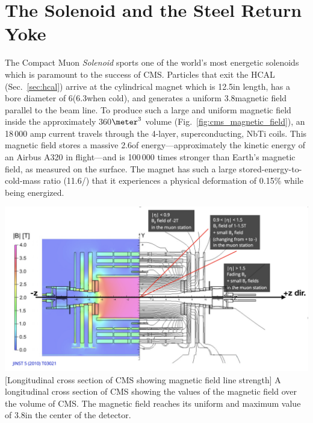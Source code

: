 \section{The Solenoid and the Steel Return Yoke}
\label{sec:solenoid}

The Compact Muon \emph{Solenoid} sports one of the world's most energetic solenoids which is paramount to the success of CMS.
Particles that exit the HCAL (Sec.~\ref{sec:hcal}) arrive at the cylindrical magnet which is 12.5\meter in length, has a bore diameter of 6\meter (6.3\meter when cold), and generates a uniform 3.8\tesla magnetic field parallel to the beam line.
To produce such a large and uniform magnetic field inside the approximately 360$\meter^3$ volume (Fig.~\ref{fig:cms_magnetic_field}), an 18\,000 amp current travels through the 4-layer, superconducting, NbTi coils.
This magnetic field stores a massive 2.6\GJ of energy---approximately the kinetic energy of an Airbus A320 in flight---and is 100\,000 times stronger than Earth's magnetic field, as measured on the surface.
The magnet has such a large stored-energy-to-cold-mass ratio (11.6\KJ/\Kgns) that it experiences a physical deformation of 0.15\% while being energized.
\begin{multiFigure}
    \centering
    \includegraphics[width=\textwidth]{figures/cms/solenoid/CMS_longitudinal_view_magnetic_field.png}
        [Longitudinal cross section of CMS showing magnetic field line strength]
        {A longitudinal cross section of CMS showing the values of the magnetic field over the volume of CMS. 
        The magnetic field reaches its uniform and maximum value of 3.8\tesla in the center of the detector.
        }
    \label{fig:cms_magnetic_field}
\end{multiFigure}

